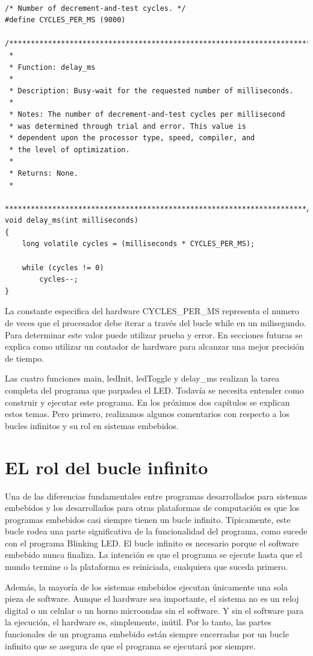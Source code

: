 \documentclass[12pt]{article}
\begin{document}
\begin{verbatim}

/* Number of decrement-and-test cycles. */
#define CYCLES_PER_MS (9000)

/**********************************************************************
 *
 * Function: delay_ms
 *
 * Description: Busy-wait for the requested number of milliseconds.
 *
 * Notes: The number of decrement-and-test cycles per millisecond
 * was determined through trial and error. This value is
 * dependent upon the processor type, speed, compiler, and
 * the level of optimization.  
 *
 * Returns: None.
 *
 **********************************************************************/
void delay_ms(int milliseconds)
{
    long volatile cycles = (milliseconds * CYCLES_PER_MS);

    while (cycles != 0)
        cycles--;
}
\end{verbatim}

La constante especifica del hardware CYCLES\_PER\_MS representa el numero
de veces que el procesador debe iterar a través del bucle while en un milisegundo.
Para determinar este valor puede utilizar prueba y error.
En secciones futuras se explica como utilizar un contador de hardware para
alcanzar una mejor precisión de tiempo. 

Las cuatro funciones main, ledInit, ledToggle y delay\_ms realizan la tarea completa del programa que parpadea el LED. Todavía se necesita entender como construir y ejecutar este programa. En los próximos dos capítulos se explican estos temas.
Pero primero, realizamos algunos comentarios con respecto a los bucles infinitos y su rol en sistemas embebidos.

\section *{EL rol del bucle infinito}

Una de las diferencias fundamentales entre programas desarrollados para sistemas
embebidos y los desarrollados para otras plataformas de computación es que los programas
embebidos casi siempre tienen un bucle infinito.
Típicamente, este bucle rodea una parte significativa de la funcionalidad
del programa, como sucede con el programa Blinking LED. El bucle infinito
es necesario porque el software embebido nunca finaliza.
La intención es que el programa se ejecute hasta que el mundo termine
o la plataforma es reiniciada, cualquiera que suceda primero.

Además, la mayoría de los sistemas embebidos ejecutan únicamente una sola
pieza de software. Aunque el hardware sea importante, el sistema
no es un reloj digital o un celular o un horno microondas sin el software.
Y sin el software para la ejecución, el hardware es, simplemente, inútil.
Por lo tanto, las partes funcionales de un programa embebido están siempre
encerradas por un bucle infinito que se asegura de que el programa
se ejecutará por siempre.
\end{document}
